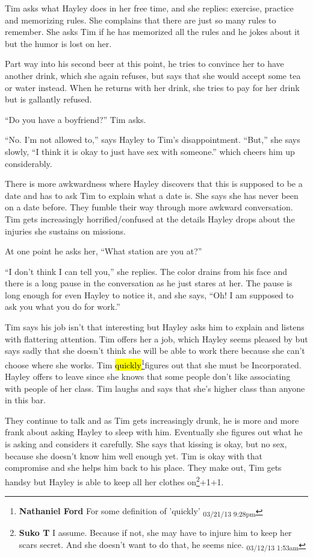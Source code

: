Tim asks what Hayley does in her free time, and she replies: exercise, practice and memorizing rules.  She complains that there are just so many rules to remember.  She asks Tim if he has memorized all the rules and he jokes about it but the humor is lost on her.



Part way into his second beer at this point, he tries to convince her to have another drink, which she again refuses, but says that she would accept some tea or water instead.  When he returns with her drink, she tries to pay for her drink but is gallantly refused.

``Do you have a boyfriend?'' Tim asks.

``No.  I'm not allowed to,'' says Hayley to Tim's disappointment.  ``But,'' she says slowly, ``I think it is okay to just have sex with someone.'' which cheers him up considerably.

There is more awkwardness where Hayley discovers that this is supposed to be a date and has to ask Tim to explain what a date is.  She says she has never been on a date before.  They fumble their way through more awkward conversation.  Tim gets increasingly horrified/confused at the details Hayley drops about the injuries she sustains on missions.  

At one point he asks her, ``What station are you at?''

``I don't think I can tell you,'' she replies.  The color drains from his face and there is a long pause in the conversation as he just stares at her.  The pause is long enough for even Hayley to notice it, and she says, ``Oh!  I am supposed to ask you what you do for work.''



Tim says his job isn't that interesting but Hayley asks him to explain and listens with flattering attention.  Tim offers her a job, which Hayley seems pleased by but says sadly that she doesn't think she will be able to work there because she can't choose where she works.  Tim \hl{quickly}\footnote{\textbf{Nathaniel Ford }For some definition of 'quickly' \textsubscript{03/21/13 9:28pm}}figures out that she must be Incorporated.  Hayley offers to leave since she knows that some people don't like associating with people of her class.   Tim laughs and says that she's higher class than anyone in this bar.



They continue to talk and as Tim gets increasingly drunk, he is more and more frank about asking Hayley to sleep with him.  Eventually she figures out what he is asking and considers it carefully.  She says that kissing is okay, but no sex, because she doesn't know him well enough yet.  Tim is okay with that compromise and she helps him back to his place.  They make out, Tim gets handsy but Hayley is able to keep all her clothes on\footnote{\textbf{Suko T }I assume.  Because if not, she may have to injure him to keep her scars secret.  And she doesn't want to do that, he seems nice. \textsubscript{03/12/13 1:53am}}+1+1.



